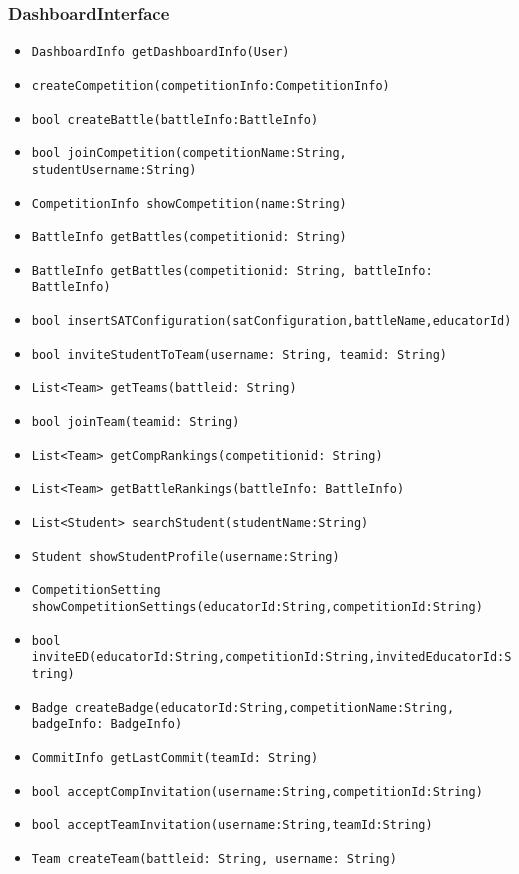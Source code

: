 \subsubsection{DashboardInterface}
\begin{itemize}
    \item \texttt{DashboardInfo getDashboardInfo(User)}
    \item \texttt{createCompetition(competitionInfo:CompetitionInfo)}
    \item \texttt{bool createBattle(battleInfo:BattleInfo)}
    \item \texttt{bool joinCompetition(competitionName:String, studentUsername:String)}
    \item \texttt{CompetitionInfo showCompetition(name:String)}
    \item \texttt{BattleInfo getBattles(competitionid: String)}
    \item \texttt{BattleInfo getBattles(competitionid: String, battleInfo: BattleInfo)}
    \item \texttt{bool insertSATConfiguration(satConfiguration,battleName,educatorId)}
    \item \texttt{bool inviteStudentToTeam(username: String, teamid: String)}
    \item \texttt{List<Team> getTeams(battleid: String)}
    \item \texttt{bool joinTeam(teamid: String)}
    \item \texttt{List<Team> getCompRankings(competitionid: String)}
    \item \texttt{List<Team> getBattleRankings(battleInfo: BattleInfo)}
    \item \texttt{List<Student> searchStudent(studentName:String)}
    \item \texttt{Student showStudentProfile(username:String)}
    \item \texttt{CompetitionSetting showCompetitionSettings(educatorId:String,competitionId:String)}
    \item \texttt{bool inviteED(educatorId:String,competitionId:String,invitedEducatorId:String)}
    \item \texttt{Badge createBadge(educatorId:String,competitionName:String, badgeInfo: BadgeInfo)}
    \item \texttt{CommitInfo getLastCommit(teamId: String)}
    \item \texttt{bool acceptCompInvitation(username:String,competitionId:String)}
    \item \texttt{bool acceptTeamInvitation(username:String,teamId:String)}
    \item \texttt{Team createTeam(battleid: String, username: String)}
\end{itemize}


